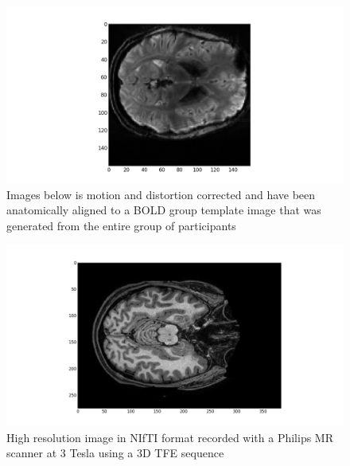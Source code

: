 \documentclass[11pt]{article}
\begin{document}
\begin{figure}[h]
\caption{Images below is motion and distortion corrected and have been anatomically
aligned to a BOLD group template image that was generated from the entire group
of participants}
\includegraphics[scale=.5]{image_3}
\centering
\end{figure}
\begin{figure}[h]
\caption{High resolution image in NIfTI format recorded with a Philips MR scanner at 3 Tesla using a 3D TFE sequence}
\includegraphics[scale=.4]{image_4}
\centering
\end{figure}


\end{document}
